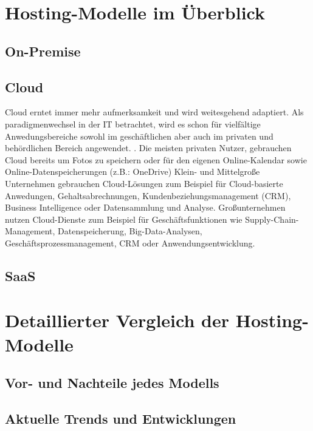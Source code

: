 \documentclass[12pt,bibtotoc]{article}
\begin{document}
	\section{Hosting-Modelle im Überblick}
		\subsection{On-Premise}
		\subsection{Cloud}
		Cloud erntet immer mehr aufmerksamkeit und wird weitesgehend adaptiert. Als paradigmenwechsel in der IT betrachtet, wird es schon für vielfältige Anwedungsbereiche sowohl im geschäftlichen aber auch im privaten und behördlichen Bereich angewendet. \cite{Murugesan.2016}.
		\newline
		Die meisten privaten Nutzer, gebrauchen Cloud bereits um Fotos zu speichern oder für den eigenen Online-Kalendar sowie Online-Datenspeicherungen (z.B.: OneDrive)
		Klein- und Mittelgroße Unternehmen gebrauchen Cloud-Lösungen zum Beispiel für Cloud-basierte Anwedungen, Gehaltsabrechnungen, Kundenbeziehungsmanagement (CRM), Business Intelligence oder Datensammlung und Analyse.
		Großunternehmen nutzen Cloud-Dienste zum Beispiel für Geschäftsfunktionen wie Supply-Chain-Management, Datenspeicherung, Big-Data-Analysen, Geschäftsprozessmanagement, CRM oder Anwendungsentwicklung.
		\subsection{SaaS}
		
	\section{Detaillierter Vergleich der Hosting-Modelle}
		\subsection{Vor- und Nachteile jedes Modells}
		\subsection{Aktuelle Trends und Entwicklungen}
\end{document}
